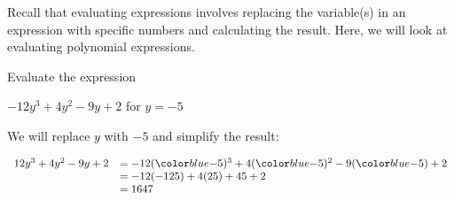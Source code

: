 \documentclass{ximera}
\begin{document}
      Recall that evaluating expressions involves replacing the variable(s) in an expression with specific numbers and calculating the result.
      Here, we will look at evaluating polynomial expressions.

\begin{example}
Evaluate the expression 
\begin{center}
$-12y^3+4y^2-9y+2$ for $y=-5$ 
\end{center}
\begin{explanation}
  We will replace $y$ with $-5$ and simplify the result:
\begin{center}
$
\begin{array}{cl}
   12y^3+4y^2-9y+2 & = -12(\substitute{-5})^3+4(\substitute{-5})^2-9(\substitute{-5})+2\\
      & = -12(-125)+4(25)+45+2 \\
        & = 1647  \\
\end{array}
$
\end{center}
\end{explanation}
\end{example}
\end{document}
